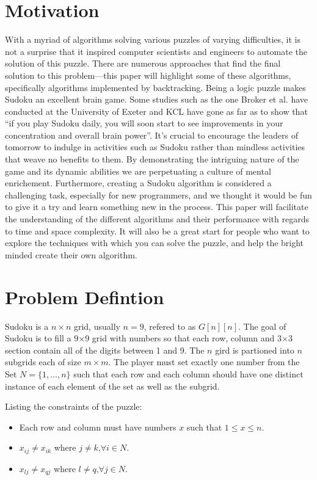 \documentclass[12pt]{extarticle}
\theoremstyle{plain}
\begin{document}
\section*{Motivation}
With a myriad of algorithms solving various puzzles of varying difficulties, it is not a surprise that it inspired computer scientists and engineers to automate the solution of this puzzle. There are numerous approaches that find the final solution to this problem—this paper will highlight some of these algorithms, specifically algorithms implemented by backtracking.
Being a logic puzzle makes Sudoku an excellent brain game. Some studies such as the one Broker et al. have conducted at the University of Exeter and KCL have gone as far as to show that “if you play Sudoku daily, you will soon start to see improvements in your concentration and overall brain power”. It’s crucial to encourage the leaders of tomorrow to indulge in activities such as Sudoku rather than mindless activities that weave no benefits to them. By demonstrating the intriguing nature of the game and its dynamic abilities we are perpetuating a culture of mental enrichement. Furthermore, creating a Sudoku algorithm is considered a challenging task, especially for new programmers, and we thought it would be fun to give it a try and learn something new in the process. This paper will facilitate the understanding of the different algorithms and their performance with regards to time and space complexity. It will also be a great start for people who want to explore the techniques with which you can solve the puzzle, and help the bright minded create their own algorithm.
\newpage
\section*{Problem Defintion}
Sudoku is a $n \times n$ grid, usually $n = 9$, refered to as $G[n][n]$. The goal of Sudoku is to fill a 9×9 grid with numbers so that each row, column and 3×3 section contain all of the digits between 1 and 9. The $n$ gird is partioned into $n$ subgrids each of size $m \times m$. The player must set exactly one number from the Set $N = \{1, \dots, n \}$ such that each row and each column should have one distinct instance of each element of the set as well as the subgrid.

\noindent Listing the constraints of the puzzle:
\begin{itemize}
    \item Each row and column must have numbers $x$ such that $1 \leq x \leq n$.
    \item $x_{ij} \neq x_{ik}$ where $j \neq k$,$\forall i \in N$.
    \item $x_{lj} \neq x_{qj}$ where $l \neq q$,$\forall j \in N$.
\end{itemize}
\end{document}
